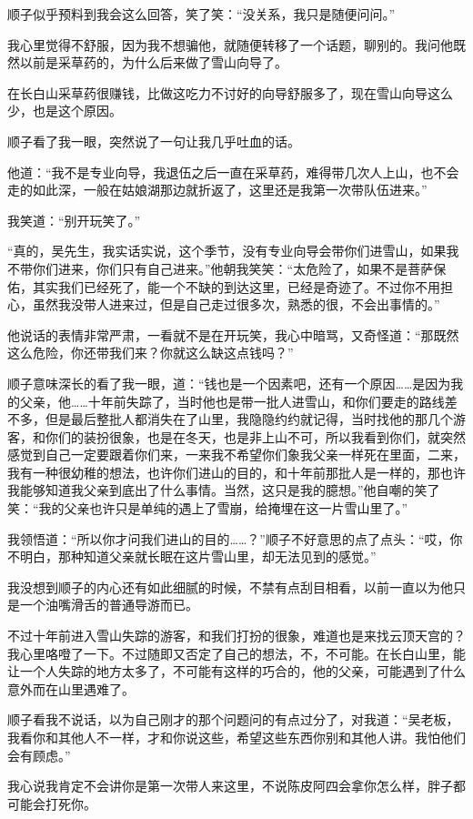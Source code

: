 顺子似乎预料到我会这么回答，笑了笑：“没关系，我只是随便问问。”

我心里觉得不舒服，因为我不想骗他，就随便转移了一个话题，聊别的。我问他既然以前是采草药的，为什么后来做了雪山向导了。

在长白山采草药很赚钱，比做这吃力不讨好的向导舒服多了，现在雪山向导这么少，也是这个原因。

顺子看了我一眼，突然说了一句让我几乎吐血的话。

他道：“我不是专业向导，我退伍之后一直在采草药，难得带几次人上山，也不会走的如此深，一般在姑娘湖那边就折返了，这里还是我第一次带队伍进来。”

我笑道：“别开玩笑了。”

“真的，吴先生，我实话实说，这个季节，没有专业向导会带你们进雪山，如果我不带你们进来，你们只有自己进来。”他朝我笑笑：“太危险了，如果不是菩萨保佑，其实我们已经死了，能一个不缺的到达这里，已经是奇迹了。不过你不用担心，虽然我没带人进来过，但是自己走过很多次，熟悉的很，不会出事情的。”

他说话的表情非常严肃，一看就不是在开玩笑，我心中暗骂，又奇怪道：“那既然这么危险，你还带我们来？你就这么缺这点钱吗？”

顺子意味深长的看了我一眼，道：“钱也是一个因素吧，还有一个原因……是因为我的父亲，他……十年前失踪了，当时他也是带一批人进雪山，和你们要走的路线差不多，但是最后整批人都消失在了山里，我隐隐约约就记得，当时找他的那几个游客，和你们的装扮很象，也是在冬天，也是非上山不可，所以我看到你们，就突然感觉到自己一定要跟着你们来，一来我不希望你们象我父亲一样死在里面，二来，我有一种很幼稚的想法，也许你们进山的目的，和十年前那批人是一样的，那也许我能够知道我父亲到底出了什么事情。当然，这只是我的臆想。”他自嘲的笑了笑：“我的父亲也许只是单纯的遇上了雪崩，给掩埋在这一片雪山里了。”

我领悟道：“所以你才问我们进山的目的……？”顺子不好意思的点了点头：“哎，你不明白，那种知道父亲就长眠在这片雪山里，却无法见到的感觉。”

我没想到顺子的内心还有如此细腻的时候，不禁有点刮目相看，以前一直以为他只是一个油嘴滑舌的普通导游而已。

不过十年前进入雪山失踪的游客，和我们打扮的很象，难道也是来找云顶天宫的？我心里咯噔了一下。不过随即又否定了自己的想法，不，不可能。在长白山里，能让一个人失踪的地方太多了，不可能有这样的巧合的，他的父亲，可能遇到了什么意外而在山里遇难了。

顺子看我不说话，以为自己刚才的那个问题问的有点过分了，对我道：“吴老板，我看你和其他人不一样，才和你说这些，希望这些东西你别和其他人讲。我怕他们会有顾虑。”

我心说我肯定不会讲你是第一次带人来这里，不说陈皮阿四会拿你怎么样，胖子都可能会打死你。


